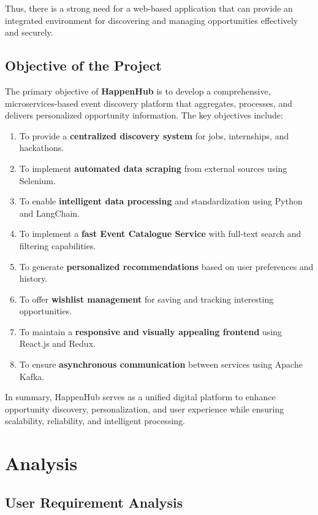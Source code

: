 \documentclass[12pt,a4paper]{report}
\begin{document}
Thus, there is a strong need for a web-based application that can provide an
integrated environment for discovering and managing opportunities effectively
and securely.

\section{Objective of the Project}
The primary objective of \textbf{HappenHub} is to develop a comprehensive,
microservices-based event discovery platform that aggregates, processes, and
delivers personalized opportunity information. The key objectives include:
\begin{enumerate}
    \item To provide a \textbf{centralized discovery system} for jobs, internships, and
          hackathons.
    \item To implement \textbf{automated data scraping} from external sources using
          Selenium.
    \item To enable \textbf{intelligent data processing} and standardization using Python
          and LangChain.
    \item To implement a \textbf{fast Event Catalogue Service} with full-text search and filtering
          capabilities.
    \item To generate \textbf{personalized recommendations} based on user preferences and
          history.
    \item To offer \textbf{wishlist management} for saving and tracking interesting
          opportunities.
    \item To maintain a \textbf{responsive and visually appealing frontend} using
          React.js and Redux.
    \item To ensure \textbf{asynchronous communication} between services using Apache
          Kafka.
\end{enumerate}

In summary, HappenHub serves as a unified digital platform to enhance
opportunity discovery, personalization, and user experience while ensuring
scalability, reliability, and intelligent processing.

\chapter{Analysis}

\section{User Requirement Analysis}
\end{document}
